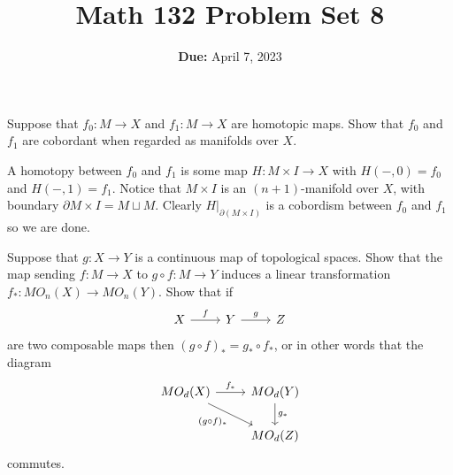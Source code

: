 \documentclass[11pt,letterpaper]{article}
\title{\textbf{Math 132 Problem Set 8}}
\date{\textbf{Due:} April 7, 2023}
\begin{document}
\maketitle

\begin{problem}
    Suppose that $f_0 : M \to X$ and $f_1 : M \to X$ are homotopic maps. Show that $f_0$ and $f_1$ are cobordant when regarded as manifolds over $X$.
\end{problem}

\begin{solution}
    \quad A homotopy between $f_0$ and $f_1$ is some map $H: M\times I \to X$ with $H(-,0) = f_0$ and $H(-,1) = f_1$. Notice that $M\times I$ is an $(n+1)$-manifold over $X$, with boundary $\partial M\times I = M\sqcup M$. Clearly $H|_{\partial (M\times I)}$ is a cobordism between $f_0$ and $f_1$ so we are done. 
\end{solution}

\begin{problem}
    Suppose that $g : X \to Y$ is a continuous map of topological spaces. Show that the map sending $f : M \to X$ to $g\circ f : M \to Y$ induces a linear transformation $f_* : MO_n(X) \to MO_n(Y)$. Show that if 
    \[\begin{tikzcd}
        X & Y & Z
        \arrow["f", from=1-1, to=1-2]
        \arrow["g", from=1-2, to=1-3]
    \end{tikzcd}\]
    are two composable maps then $(g\circ f)_*=g_*\circ f_*$, or in other words that the diagram
    \[\begin{tikzcd}
        {MO_d(X)} & {MO_d(Y)} \\
        & {MO_d(Z)}
        \arrow["{f_*}", from=1-1, to=1-2]
        \arrow["{g_*}", from=1-2, to=2-2]
        \arrow["{(g\circ f)_*}"', from=1-1, to=2-2]
    \end{tikzcd}\]
    commutes.
\end{problem}
\end{document}
